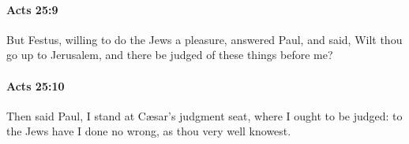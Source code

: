 		\paragraph{Acts 25:9} %
			\label{ACTS-25-9}

			But Festus, willing to do the Jews a pleasure, answered Paul, and said, Wilt thou go up to Jerusalem, and there be judged of these things before me?

			\begin{framed}
			\scriptsize
				\begin{compactdesc}
					\item[SBLG] 
				\end{compactdesc}
			\end{framed}

		\paragraph{Acts 25:10} %
			\label{ACTS-25-10}

			Then said Paul, I stand at Cæsar's judgment seat, where I ought to be judged: to the Jews have I done no wrong, as thou very well knowest.

